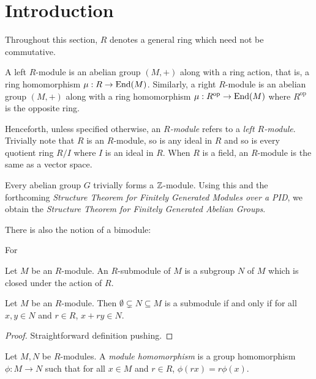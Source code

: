 \section{Introduction}
Throughout this section, $R$ denotes a general ring which need not be commutative.

\begin{definition}[Module]
    A left $R$-module is an abelian group $(M,+)$ along with a ring action, that is, a ring homomorphism $\mu: R\to\operatorname{End}(M)$. Similarly, a right $R$-module is an abelian group $(M,+)$ along with a ring homomorphism $\mu: R^\text{op}\to\operatorname{End}(M)$ where $R^\text{op}$ is the opposite ring.
\end{definition}

Henceforth, unless specified otherwise, an \textit{$R$-module} refers to a \textit{left $R$-module}. Trivially note that $R$ is an $R$-module, so is any ideal in $R$ and so is every quotient ring $R/I$ where $I$ is an ideal in $R$. When $R$ is a field, an $R$-module is the same as a vector space.

Every abelian group $G$ trivially forms a $\mathbb{Z}$-module. Using this and the forthcoming \textit{Structure Theorem for Finitely Generated Modules over a PID}, we obtain the \textit{Structure Theorem for Finitely Generated Abelian Groups}.

There is also the notion of a bimodule: 
\begin{definition}
    For 
\end{definition}

\begin{definition}[Submodule]
    Let $M$ be an $R$-module. An $R$-submodule of $M$ is a subgroup $N$ of $M$ which is closed under the action of $R$.
\end{definition}

\begin{proposition}
    Let $M$ be an $R$-module. Then $\emptyset\subsetneq N\subseteq M$ is a submodule if and only if for all $x,y\in N$ and $r\in R$, $x + ry\in N$.
\end{proposition}
\begin{proof}
    Straightforward definition pushing.
\end{proof}

\begin{definition}
    Let $M, N$ be $R$-modules. A \textit{module homomorphism} is a group homomorphism $\phi: M\to N$ such that for all $x\in M$ and $r\in R$, $\phi(rx) = r\phi(x)$.
\end{definition}

